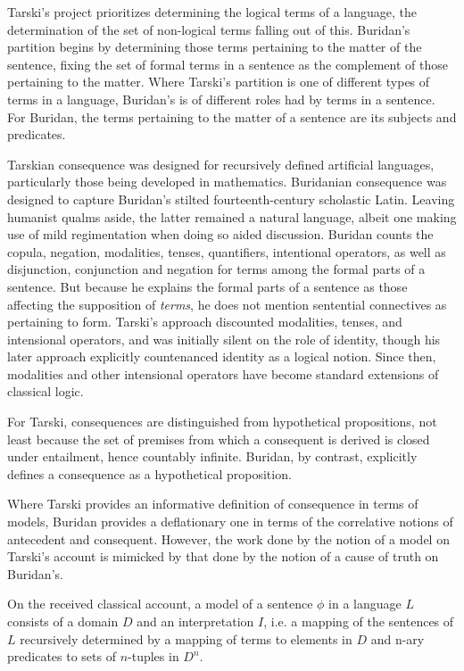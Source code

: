 \documentclass[]{article}
\begin{document}
Tarski's project prioritizes determining the logical terms of a language, the determination of the set of non-logical terms falling out of this. Buridan's partition begins by determining those terms pertaining to the matter of the sentence, fixing the set of formal terms in a sentence as the complement of those pertaining to the matter. Where Tarski's partition is one of different types of terms in a language, Buridan's is of different roles had by terms in a sentence. For Buridan, the terms pertaining to the matter of a sentence are its subjects and predicates.

Tarskian consequence was designed for recursively defined artificial languages, particularly those being developed in mathematics. Buridanian consequence was designed to capture Buridan's stilted fourteenth-century scholastic Latin. Leaving humanist qualms aside, the latter remained a natural language, albeit one making use of mild regimentation when doing so aided discussion. Buridan counts the copula, negation, modalities, tenses, quantifiers, intentional operators, as well as disjunction, conjunction and negation for terms among the formal parts of a sentence. But because he explains the formal parts of a sentence as those affecting the supposition of \textit{terms}, he does not mention sentential connectives as pertaining to form. Tarski's approach discounted modalities, tenses, and intensional operators, and was initially silent on the role of identity, though his later approach explicitly countenanced identity as a logical notion. Since then, modalities and other intensional operators have become standard extensions of classical logic.

For Tarski, consequences are distinguished from hypothetical propositions, not least because the set of premises from which a consequent is derived is closed under entailment, hence countably infinite. Buridan, by contrast, explicitly defines a consequence as a hypothetical proposition.

Where Tarski provides an informative definition of consequence in terms of models, Buridan provides a deflationary one in terms of the correlative notions of antecedent and consequent. However, the work done by the notion of a model on Tarski's account is mimicked by that done by the notion of a cause of truth on Buridan's. 

On the received classical account, a model of a sentence $\phi$ in a language $L$ consists of a domain $D$ and an interpretation $I$, i.e. a mapping of the sentences of $L$ recursively determined by a mapping of terms to elements in $D$ and n-ary predicates to sets of $n$-tuples in $D^{n}$.
\end{document}
